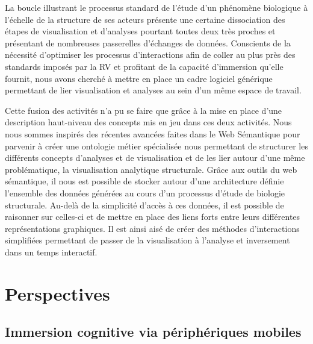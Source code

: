 



La boucle illustrant le processus standard de l'étude d'un phénomène biologique à l'échelle de la structure de ses acteurs présente une certaine dissociation des étapes de visualisation et d'analyses pourtant toutes deux très proches et présentant de nombreuses passerelles d'échanges de données. Conscients de la nécessité d'optimiser les processus d'interactions afin de coller au plus près des standards imposés par la RV et profitant de la capacité d'immersion qu'elle fournit, nous avons cherché à mettre en place un cadre logiciel générique permettant de lier visualisation et analyses au sein d'un même espace de travail.

Cette fusion des activités n'a pu se faire que grâce à la mise en place d'une description haut-niveau des concepts mis en jeu dans ces deux activités. Nous nous sommes inspirés des récentes avancées faites dans le Web Sémantique pour parvenir à créer une ontologie métier spécialisée nous permettant de structurer les différents concepts d'analyses et de visualisation et de les lier autour d'une même problématique, la visualisation analytique structurale. 
Grâce aux outils du web sémantique, il nous est possible de stocker autour d'une architecture définie l'ensemble des données générées au cours d'un processus d'étude de biologie structurale. Au-delà de la simplicité d'accès à ces données, il est possible de raisonner sur celles-ci et de mettre en place des liens forts entre leurs différentes représentations graphiques. Il est ainsi aisé de créer des méthodes d'interactions simplifiées permettant de passer de la visualisation à l'analyse et inversement dans un temps interactif.


\section*{Perspectives}

\subsection{Immersion cognitive via périphériques mobiles}

